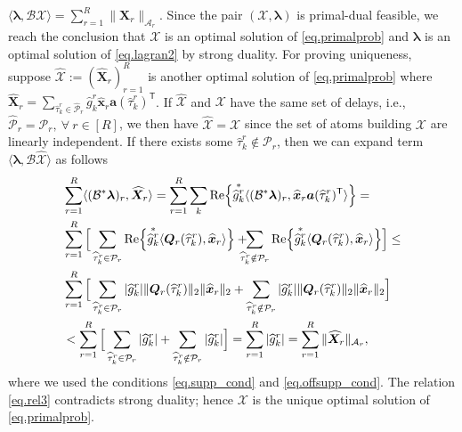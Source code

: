 \documentclass[conference,10pt]{IEEEtran}
\theoremstyle{remark}
\theoremstyle{plain}
\theoremstyle{definition}
\theoremstyle{remark}
\begin{document}
$\langle \bm{\lambda}, \mathcal{B}\bm{\mathcal{X}}\rangle=\sum_{r=1}^R\|\bm{X}_r\|_{\mathcal{A}_r}$. Since the pair $(\bm{\mathcal{X}}, \bm{\lambda})$ is primal-dual feasible, we reach the conclusion that $\bm{\mathcal{X}}$ is an optimal solution of \eqref{eq.primalprob} and $\bm{\lambda}$ is an optimal solution of \eqref{eq.lagran2} by strong duality. For proving uniqueness, suppose $\widehat{\bm{\mathcal{X}}}:=(\widehat{\bm{X}}_r)_{r=1}^R$ is another optimal solution of \eqref{eq.primalprob} where $\widehat{\bm{X}}_r=\sum_{\widehat{\tau}_k^r\in \widehat{\mathcal{P}}_r}\widehat{g}_k^r\widehat{\bm{x}}_r\bm{a}(\widehat{\tau}_k^r)^{\mathsf{T}}$. If $\widehat{\bm{\mathcal{X}}}$ and $\bm{\mathcal{X}}$ have the same set of delays, i.e., $\widehat{\mathcal{P}}_r=\mathcal{P}_r,~\forall~r \in [R]$, we then have $\widehat{\bm{\mathcal{X}}}=\bm{\mathcal{X}}$ since the set of atoms building $\bm{\mathcal{X}}$ are linearly independent. If there exists some $\widehat{\tau}_k^r\notin \mathcal{P}_r$, then we can expand term $\langle \bm{\lambda}, \mathcal{B}\widehat{\bm{\mathcal{X}}}\rangle$ as follows 
\begin{align}\label{eq.rel3}
&\sum_{r=1}^R\langle (\mathcal{B}^*\bm{\lambda})_r, \widehat{\bm{X}}_r\rangle=
\sum_{r=1}^R \sum_{k}{\rm Re}\Big\{{\overset{*}{\widehat{g}_k^r}}\langle (\mathcal{B}^*\bm{\lambda})_r, \widehat{\bm{x}}_r\bm{a}(\widehat{\tau}_k^r)^{\mathsf{T}} \rangle\Big\}=\nonumber\\
&	\sum_{r=1}^R\Big[\sum_{\widehat{\tau}_k^r\in \mathcal{P}_r}{\rm Re}\Big\{{\overset{*}{\widehat{g}_k^r}}
\langle\bm{Q}_r(\widehat{\tau}_k^r),\widehat{\bm{x}}_r \rangle\Big\}+\hspace{-8pt}\sum_{\widehat{\tau}_k^r\notin \mathcal{P}_r}{\rm Re}\Big\{{\overset{*}{\widehat{g}_k^r}}
\langle\bm{Q}_r(\widehat{\tau}_k^r),\widehat{\bm{x}}_r \rangle\Big\}\Big]\le\nonumber\\
&\sum_{r=1}^R\Big[\sum_{\widehat{\tau}_k^r\in \mathcal{P}_r}|\widehat{g}_k^r|
\|\bm{Q}_r(\widehat{\tau}_k^r)\|_2\|\widehat{\bm{x}}_r\|_2 +\sum_{\widehat{\tau}_k^r\notin \mathcal{P}_r}|\widehat{g}_k^r|
\|\bm{Q}_r(\widehat{\tau}_k^r)\|_2\|\widehat{\bm{x}}_r\|_2\Big]\nonumber\\
&<\sum_{r=1}^R\Big[\sum_{\widehat{\tau}_k^r\in \mathcal{P}_r}|\widehat{g}_k^r|
 +\sum_{\widehat{\tau}_k^r\notin \mathcal{P}_r}|\widehat{g}_k^r|\Big]=\sum_{r=1}^R|\widehat{g}_k^r|=\sum_{r=1}^R\|\widehat{\bm{X}}_r\|_{\mathcal{A}_r},
\end{align}
where we used the conditions \eqref{eq.supp_cond} and \eqref{eq.offsupp_cond}. The relation \eqref{eq.rel3} contradicts strong duality; hence $\bm{\mathcal{X}}$ is the unique optimal solution of \eqref{eq.primalprob}.





% 
\end{document}

